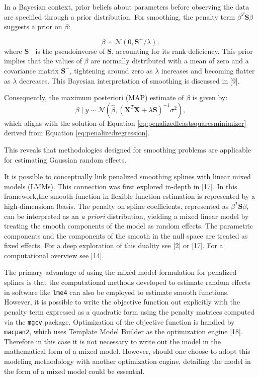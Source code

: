 \documentclass[
11pt, %
oneside, %
english, %
singlespacing, %
]{macthesis} %
\begin{document}
In a Bayesian context, prior beliefs about parameters before observing the data are specified through a prior distribution. For smoothing, the penalty term \(\beta^T \mathbf{S} \beta\) suggests a prior on \(\beta\):

\begin{equation}
\beta \sim \mathcal{N}(0, \mathbf{S}^{-}/\lambda),
\label{eq:penalty prior}
\end{equation}
where \(\mathbf{S}^{-}\) is the pseudoinverse of \(\mathbf{S}\), accounting for its rank deficiency. This prior implies that the values of \(\beta\) are normally distributed with a mean of zero and a covariance matrix \(\mathbf{S}^{-}\), tightening around zero as \(\lambda\) increases and becoming flatter as \(\lambda\) decreases. This Bayesian interpretation of smoothing is discussed in {[}9{]}.

Consequently, the maximum posteriori (MAP) estimate of \(\beta\) is given by:
\begin{equation}
\beta \mid y \sim \mathcal{N}(\hat{\beta}, (\mathbf{X}^T \mathbf{X} + \lambda \mathbf{S})^{-1} \sigma^2),
\label{eq:MAP estimate}
\end{equation}
which aligns with the solution of Equation \ref{eq:penalizedleastsquaresminimizer} derived from Equation \ref{eq:penalizedregression}.

This reveals that methodologies designed for smoothing problems are applicable for estimating Gaussian random effects.

It is possible to conceptually link penalized smoothing splines with linear mixed models (LMMs). This connection was first explored in-depth in {[}17{]}. In this framework,the smooth function in flexible function estimation is represented by a high-dimensiona lbasis. The penalty on spline coefficients, represented as \(\beta^T \mathbf{S} \beta\), can be interpreted as an \emph{a priori} distribution, yielding a mixed linear model by treating the smooth components of the model as random effects. The parametric components and the components of the smooth in the null space are treated as fixed effects. For a deep exploration of this duality see {[}2{]} or {[}17{]}. For a computational overview see {[}14{]}.

The primary advantage of using the mixed model formulation for penalized splines is that the computational methods developed to estimate random effects in software like \texttt{lme4} can also be employed to estimate smooth functions. However, it is possible to write the objective function out explicitly with the penalty term expressed as a quadratic form using the penalty matrices computed via the \texttt{mgcv} package. Optimization of the objective function is handled by \texttt{macpan2}, which uses Template Model Builder as the optimization engine {[}18{]}. Therefore in this case it is not necessary to write out the model in the mathematical form of a mixed model. However, should one choose to adopt this modeling methodology with another optimization engine, detailing the model in the form of a mixed model could be essential.
\end{document}
